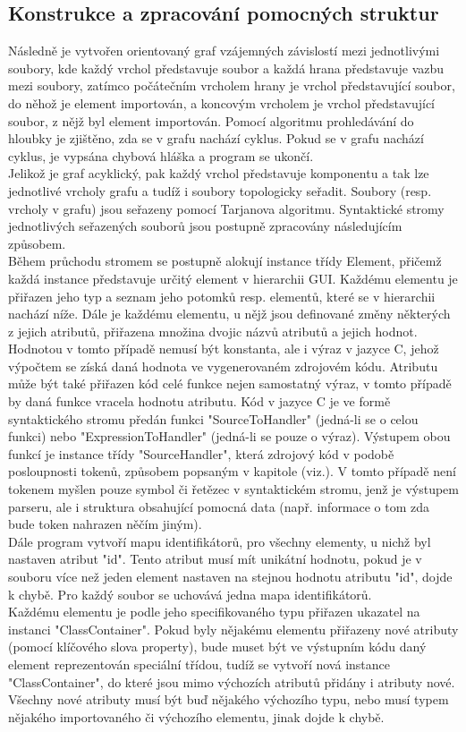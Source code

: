 \documentclass[report,11pt]{elsarticle}
\begin{document}
\subsection{Konstrukce a zpracování pomocných struktur}
Následně je vytvořen orientovaný graf vzájemných závislostí mezi jednotlivými soubory, kde každý vrchol představuje soubor a každá hrana představuje vazbu mezi soubory, zatímco počátečním vrcholem hrany je vrchol představující soubor, do něhož je element importován, a koncovým vrcholem je vrchol představující soubor, z nějž byl element importován. Pomocí algoritmu prohledávání do hloubky je zjištěno, zda se v grafu nachází cyklus. Pokud se v grafu nachází cyklus, je vypsána chybová hláška a program se ukončí.\\
Jelikož je graf acyklický, pak každý vrchol představuje komponentu a tak lze jednotlivé vrcholy grafu a tudíž i soubory topologicky seřadit. Soubory (resp. vrcholy v grafu) jsou seřazeny pomocí Tarjanova algoritmu. Syntaktické stromy jednotlivých seřazených souborů jsou postupně zpracovány následujícím způsobem.\\
Během průchodu stromem se postupně alokují instance třídy Element, přičemž každá instance představuje určitý element v hierarchii GUI. Každému elementu je přiřazen jeho typ a seznam jeho potomků resp. elementů, které se v hierarchii nachází níže. Dále je každému elementu, u nějž jsou definované změny některých z jejich atributů, přiřazena množina dvojic názvů atributů a jejich hodnot. Hodnotou v tomto případě nemusí být konstanta, ale i výraz v jazyce C, jehož výpočtem se získá daná hodnota ve vygenerovaném zdrojovém kódu. Atributu může být také přiřazen kód celé funkce nejen samostatný výraz, v tomto případě by daná funkce vracela hodnotu atributu. Kód v jazyce C je ve formě syntaktického stromu předán funkci "SourceToHandler" (jedná-li se o celou funkci) nebo "ExpressionToHandler" (jedná-li se pouze o výraz). Výstupem obou funkcí je instance třídy "SourceHandler", která zdrojový kód v podobě posloupnosti tokenů, způsobem popsaným v kapitole (viz.). V tomto případě není tokenem myšlen pouze symbol či řetězec v syntaktickém stromu, jenž je výstupem parseru, ale i struktura obsahující pomocná data (např. informace o tom zda bude token nahrazen něčím jiným).\\
Dále program vytvoří mapu identifikátorů, pro všechny elementy, u nichž byl nastaven atribut "id". Tento atribut musí mít unikátní hodnotu, pokud je v souboru více než jeden element nastaven na stejnou hodnotu atributu "id", dojde k chybě. Pro každý soubor se uchovává jedna mapa identifikátorů.\\
Každému elementu je podle jeho specifikovaného typu přiřazen ukazatel na instanci "ClassContainer". Pokud byly nějakému elementu přiřazeny nové atributy (pomocí klíčového slova property), bude muset být ve výstupním kódu daný element reprezentován speciální třídou, tudíž se vytvoří nová instance "ClassContainer", do které jsou mimo výchozích atributů přidány i atributy nové. Všechny nové atributy musí být buď nějakého výchozího typu, nebo musí typem nějakého importovaného či výchozího elementu, jinak dojde k chybě.
\end{document}
